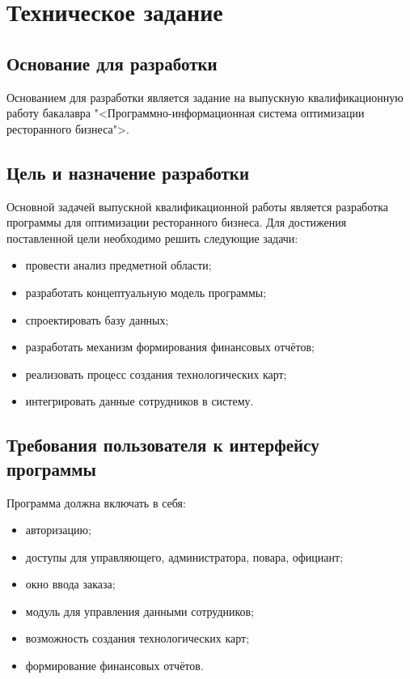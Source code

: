 \section{Техническое задание}


\subsection{Основание для разработки}
Основанием для разработки является задание на выпускную квалификационную работу бакалавра "<Программно-информационная система оптимизации ресторанного бизнеса">.

\subsection{Цель и назначение разработки}
Основной задачей выпускной квалификационной работы является разработка программы для оптимизации ресторанного бизнеса. Для достижения поставленной цели необходимо решить следующие задачи: 
\begin{itemize}
	\item провести анализ предметной области; 
	\item разработать концептуальную модель программы; 
	\item спроектировать базу данных;
	\item разработать механизм формирования финансовых отчётов;
	\item реализовать процесс создания технологических карт;
	\item интегрировать данные сотрудников в систему.
\end{itemize}

\subsection{Требования пользователя к интерфейсу программы}
Программа должна включать в себя:
\begin{itemize}
    \item авторизацию;
    \item доступы для управляющего, администратора, повара, официант;
    \item окно ввода заказа;
    \item модуль для управления данными сотрудников;
    \item возможность создания технологических карт;
    \item формирование финансовых отчётов.
\end{itemize}

